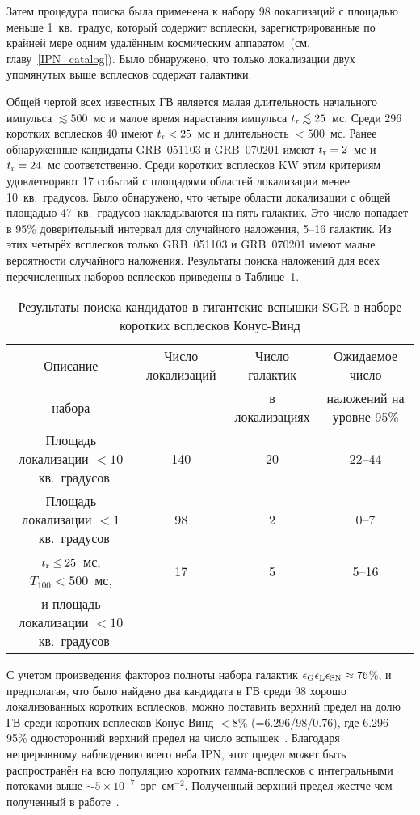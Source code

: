 Затем процедура поиска была применена к набору 98 локализаций с площадью меньше 
1~кв.~градус, который содержит всплески, зарегистрированные по крайней мере одним 
удалённым космическим аппаратом~(см. главу~\ref{IPN_catalog}). Было обнаружено, 
что только локализации двух упомянутых выше всплесков содержат галактики.

Общей чертой всех известных ГВ является малая длительность начального импульса 
$\lesssim 500$~мс и малое время нарастания импульса $t_{{\mathrm{r}}} \lesssim 25$~мс. 
Среди 296 коротких всплесков 40 имеют $t_{{\mathrm{r}}}<25$~мс и длительность $<500$~мс. 
Ранее обнаруженные кандидаты GRB~051103 и GRB~070201 имеют $t_{{\mathrm{r}}}=2$~мс 
и~$t_{{\mathrm{r}}}=24$~мс соответственно. Среди коротких всплесков KW этим 
критериям удовлетворяют 17 событий с площадями областей локализации менее 10~кв.~градусов.
Было обнаружено, что четыре области локализации с общей площадью 47~кв.~градусов накладываются на пять галактик. 
Это число попадает в 95\% доверительный интервал для случайного наложения, 5--16 галактик. Из этих 
четырёх всплесков только GRB~051103 и GRB~070201 имеют малые вероятности случайного наложения.
Результаты поиска наложений для всех перечисленных наборов всплесков приведены 
в Таблице~\ref{tab:SearchResults}.

\begin{table}[h]
  \centering
  \scriptsize
  \caption{Результаты поиска кандидатов в гигантские вспышки SGR в 
  наборе коротких всплесков Конус-Винд}
  \label{tab:SearchResults}
  \begin{tabular}{cccc}
  \hline
  \hline
Описание & Число локализаций  & Число галактик & Ожидаемое число  \\
набора   &                    & в локализациях & наложений на уровне 95\% \\
\hline
Площадь локализации $<10$~кв.~градусов  & 140 & 20 & 22--44 \\
Площадь локализации $<1$~кв.~градусов   & 98 & 2 & 0--7\\
$t_{{\mathrm{r}}} \leq 25$~мс, $T_{100}<500$~мс, & 17 & 5 & 5--16\\
и площадь локализации $<10$~кв.~градусов & & & \\
\hline
\end{tabular}
\end{table}

С учетом произведения факторов полноты набора галактик $\epsilon_{{\mathrm{G}}} \epsilon_{{\mathrm{L}}} \epsilon_{{\mathrm{SN}}} \approx 76$\%, 
и предполагая, что было найдено два кандидата в ГВ среди 98 хорошо локализованных коротких всплесков, 
можно поставить верхний предел на долю ГВ среди коротких всплесков Конус-Винд 
$<8$\% (=6.296/98/0.76), где 6.296~--- 95\% односторонний верхний предел на 
число вспышек~\citep{Gehrels1986}. Благодаря непрерывному наблюдению всего неба IPN, 
этот предел может быть распространён на всю популяцию коротких гамма-всплесков с 
интегральными потоками выше $\sim 5\times 10^{-7}$~эрг~см$^{-2}$. Полученный верхний 
предел жестче чем полученный в работе~\citep{Ofek_2007ApJ}.

